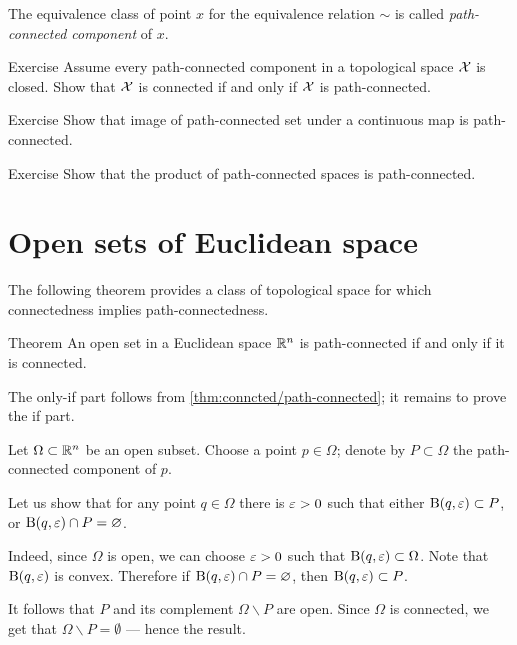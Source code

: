The equivalence class of point $x$ for the equivalence relation $\sim$ is called \emph{path-connected component} of $x$. 

\begin{thm}{Exercise}
Assume every path-connected component in a topological space $\mathcal{X}$ is closed.
Show that $\mathcal{X}$ is connected if and only if $\mathcal{X}$ is path-connected.
\end{thm}

\begin{thm}{Exercise}
Show that image of path-connected set under a continuous map is path-connected.
\end{thm}

\begin{thm}{Exercise}
Show that the product of path-connected spaces is path-connected.
\end{thm}

\section{Open sets of Euclidean space}

The following theorem provides a class of topological space for which connectedness implies path-connectedness.

\begin{thm}{Theorem}
An open set in a Euclidean space $\mathbb{R}^n$ is path-connected if and only if it is connected.
\end{thm}

The only-if part follows from \ref{thm:conncted/path-connected};
it remains to prove the if part.

Let $\Omega\subset\mathbb{R}^n$ be an open subset.
Choose a point $p\in\Omega$; denote by $P\subset \Omega$ the path-connected component of $p$.

Let us show that for any point $q\in \Omega$ there is $\varepsilon>0$ such that either $\mathrm{B}(q,\varepsilon)\subset P$, or $\mathrm{B}(q,\varepsilon)\cap P=\varnothing$.

Indeed, since $\Omega$ is open, we can choose $\varepsilon>0$ such that $\mathrm{B}(q,\varepsilon)\subset\Omega$.
Note that $\mathrm{B}(q,\varepsilon)$ is convex.
Therefore if $\mathrm{B}(q,\varepsilon)\cap P=\varnothing$, then $\mathrm{B}(q,\varepsilon)\subset P$.

It follows that $P$ and its complement $\Omega\backslash P$ are open.
Since $\Omega$ is connected, we get that $\Omega\backslash P=\emptyset$ --- hence the result.
\qeds



